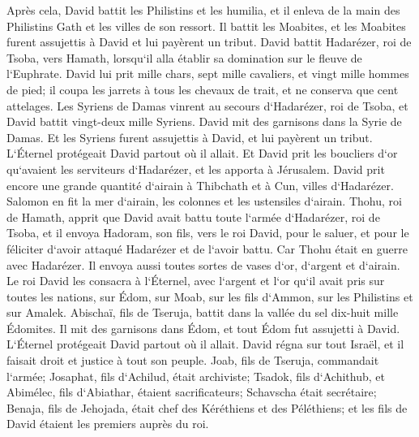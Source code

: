 \verse Après cela, David battit les Philistins et les humilia, et il enleva de la main des Philistins Gath et les villes de son ressort. 
\verse Il battit les Moabites, et les Moabites furent assujettis à David et lui payèrent un tribut. 
\verse David battit Hadarézer, roi de Tsoba, vers Hamath, lorsqu`il alla établir sa domination sur le fleuve de l`Euphrate. 
\verse David lui prit mille chars, sept mille cavaliers, et vingt mille hommes de pied; il coupa les jarrets à tous les chevaux de trait, et ne conserva que cent attelages. 
\verse Les Syriens de Damas vinrent au secours d`Hadarézer, roi de Tsoba, et David battit vingt-deux mille Syriens. 
\verse David mit des garnisons dans la Syrie de Damas. Et les Syriens furent assujettis à David, et lui payèrent un tribut. L`Éternel protégeait David partout où il allait. 
\verse Et David prit les boucliers d`or qu`avaient les serviteurs d`Hadarézer, et les apporta à Jérusalem. 
\verse David prit encore une grande quantité d`airain à Thibchath et à Cun, villes d`Hadarézer. Salomon en fit la mer d`airain, les colonnes et les ustensiles d`airain. 
\verse Thohu, roi de Hamath, apprit que David avait battu toute l`armée d`Hadarézer, roi de Tsoba, 
\verse et il envoya Hadoram, son fils, vers le roi David, pour le saluer, et pour le féliciter d`avoir attaqué Hadarézer et de l`avoir battu. Car Thohu était en guerre avec Hadarézer. Il envoya aussi toutes sortes de vases d`or, d`argent et d`airain. 
\verse Le roi David les consacra à l`Éternel, avec l`argent et l`or qu`il avait pris sur toutes les nations, sur Édom, sur Moab, sur les fils d`Ammon, sur les Philistins et sur Amalek. 
\verse Abischaï, fils de Tseruja, battit dans la vallée du sel dix-huit mille Édomites. 
\verse Il mit des garnisons dans Édom, et tout Édom fut assujetti à David. L`Éternel protégeait David partout où il allait. 
\verse David régna sur tout Israël, et il faisait droit et justice à tout son peuple. 
\verse Joab, fils de Tseruja, commandait l`armée; Josaphat, fils d`Achilud, était archiviste; 
\verse Tsadok, fils d`Achithub, et Abimélec, fils d`Abiathar, étaient sacrificateurs; Schavscha était secrétaire; 
\verse Benaja, fils de Jehojada, était chef des Kéréthiens et des Péléthiens; et les fils de David étaient les premiers auprès du roi. 

\chapter{}

